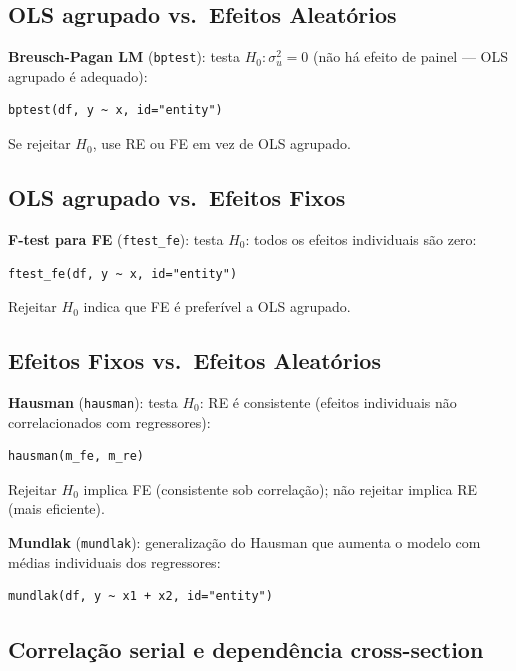 \subsection{OLS agrupado vs.\ Efeitos Aleatórios}

\textbf{Breusch-Pagan LM} (\texttt{bptest}): testa $H_0: \sigma_u^2 = 0$
(não há efeito de painel — OLS agrupado é adequado):

\begin{lstlisting}
bptest(df, y ~ x, id="entity")
\end{lstlisting}

Se rejeitar $H_0$, use RE ou FE em vez de OLS agrupado.

\subsection{OLS agrupado vs.\ Efeitos Fixos}

\textbf{F-test para FE} (\texttt{ftest\_fe}): testa $H_0$: todos os efeitos
individuais são zero:

\begin{lstlisting}
ftest_fe(df, y ~ x, id="entity")
\end{lstlisting}

Rejeitar $H_0$ indica que FE é preferível a OLS agrupado.

\subsection{Efeitos Fixos vs.\ Efeitos Aleatórios}

\textbf{Hausman} (\texttt{hausman}): testa $H_0$: RE é consistente (efeitos
individuais não correlacionados com regressores):

\begin{lstlisting}
hausman(m_fe, m_re)
\end{lstlisting}

Rejeitar $H_0$ implica FE (consistente sob correlação); não rejeitar implica
RE (mais eficiente).

\textbf{Mundlak} (\texttt{mundlak}): generalização do Hausman que aumenta o
modelo com médias individuais dos regressores:

\begin{lstlisting}
mundlak(df, y ~ x1 + x2, id="entity")
\end{lstlisting}

\subsection{Correlação serial e dependência cross-section}

